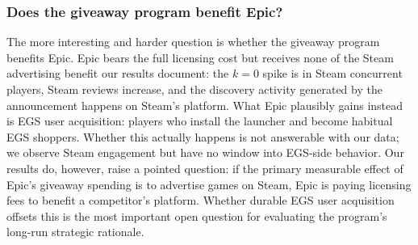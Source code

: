 \documentclass[11pt]{article}
\begin{document}
\subsubsection*{Does the giveaway program benefit Epic?}

The more interesting and harder question is whether the giveaway program
benefits Epic. Epic bears the full licensing cost but receives none of
the Steam advertising benefit our results document: the $k = 0$ spike is
in Steam concurrent players, Steam reviews increase, and the discovery
activity generated by the announcement happens on Steam's platform.
What Epic plausibly gains instead is EGS user acquisition: players who
install the launcher and become habitual EGS shoppers. Whether this
actually happens is not answerable with our data; we observe Steam
engagement but have no window into EGS-side behavior. Our results do,
however, raise a pointed question: if the primary measurable effect of
Epic's giveaway spending is to advertise games on Steam, Epic is paying
licensing fees to benefit a competitor's platform. Whether durable EGS
user acquisition offsets this is the most important open question for
evaluating the program's long-run strategic rationale.

\clearpage
\end{document}

